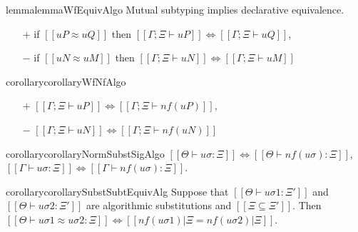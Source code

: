 \begin{restatable}{lemma}{lemmaWfEquivAlgo}
    \label{lemma:wf-equiv-algo}
    Mutual subtyping implies declarative equivalence.
    \begin{itemize}
    \item[$+$] if $[[uP ≈ uQ]]$ then $[[Γ; Ξ ⊢ uP]] \iff [[Γ; Ξ ⊢ uQ]]$,
    \item[$-$] if $[[uN ≈ uM]]$ then $[[Γ; Ξ ⊢ uN]] \iff [[Γ; Ξ ⊢ uM]]$
    \end{itemize}
\end{restatable}

\begin{restatable}{corollary}{corollaryWfNfAlgo}
    \label{corollary:wf-nf-algo}
    \begin{itemize}
        \item[$+$] $[[Γ; Ξ ⊢ uP]] \iff [[Γ; Ξ ⊢ nf(uP)]]$,
        \item[$-$] $[[Γ; Ξ ⊢ uN]] \iff [[Γ; Ξ ⊢ nf(uN)]]$
    \end{itemize}
\end{restatable}


\begin{restatable}{corollary}{corollaryNormSubstSigAlgo}
    \label{corollary:norm-subst-sig-algo}
    \hfill
    $[[Θ ⊢ uσ : Ξ]] \iff [[Θ ⊢ nf(uσ) : Ξ]]$,
    $[[Γ ⊢ uσ : Ξ]] \iff [[Γ ⊢ nf(uσ) : Ξ]]$.
\end{restatable}


\begin{restatable}{corollary}{corollarySubstSubtEquivAlg}
    \label{corollary:subst-subt-equiv-algorithmization}
    Suppose that $[[Θ ⊢ uσ1 : Ξ']]$ and $[[Θ ⊢ uσ2 : Ξ']]$ are algorithmic substitutions
    and $[[Ξ ⊆ Ξ']]$. 
    Then $[[Θ ⊢ uσ1 ≈ uσ2 : Ξ]] \iff [[nf(uσ1)|Ξ = nf(uσ2)|Ξ]]$.
\end{restatable}

